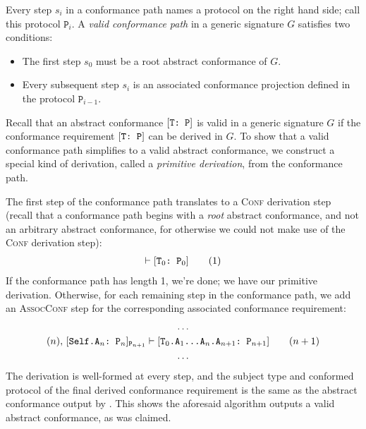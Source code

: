 \documentclass[../generics]{subfiles}
\begin{document}
Every step $s_i$ in a conformance path names a protocol on the right hand side; call this protocol $\texttt{P}_i$. A \emph{valid conformance path} in a generic signature $G$ satisfies two conditions:
\begin{itemize}
\item The first step $s_0$ must be a root abstract conformance of $G$.
\item Every subsequent step $s_i$ is an associated conformance projection defined in the protocol $\texttt{P}_{i-1}$.
\end{itemize}

Recall that an abstract conformance $[\texttt{T:~P}]$ is valid in a generic signature $G$ if the conformance requirement $[\texttt{T:~P}]$ can be derived in $G$. To show that a valid conformance path simplifies to a valid abstract conformance, we construct a special kind of derivation, called a \emph{primitive derivation}, from the conformance path.

The first step of the conformance path translates to a \textsc{Conf} derivation step (recall that a conformance path begins with a \emph{root} abstract conformance, and not an arbitrary abstract conformance, for otherwise we could not make use of the \textsc{Conf} derivation step):
\begin{gather*}
\vdash[\texttt{$\texttt{T}_0$:~$\texttt{P}_0$}]\tag{1}
\end{gather*}
If the conformance path has length 1, we're done; we have our primitive derivation. Otherwise, for each remaining step in the conformance path, we add an \textsc{AssocConf} step for the corresponding associated conformance requirement:
\begin{gather*}
\ldots\\
(n),\,[\texttt{Self.$\texttt{A}_n$:~$\texttt{P}_n$}]_{\texttt{P}_{n+1}}\vdash[\texttt{$\texttt{T}_0$.$\texttt{A}_1$...$\texttt{A}_{n}$.$\texttt{A}_{n+1}$:~$\texttt{P}_{n+1}$}]\tag{$n+1$}\\
\ldots
\end{gather*}
The derivation is well-formed at every step, and the subject type and conformed protocol of the final derived conformance requirement is the same as the abstract conformance output by . This shows the aforesaid algorithm outputs a valid abstract conformance, as was claimed.
\end{document}
